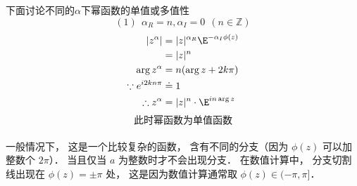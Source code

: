 下面讨论不同的$\alpha$下幂函数的单值或多值性\\

\[
(1)~~\alpha_R=n,\alpha_I=0~~(n\in\mathbb Z)
\]
\begin{align}
|z^\alpha|&=|z|^{\alpha_R}\E^{-\alpha_I\phi(z)}\notag\\
&=|z|^{n}\notag\\
\arg z^\alpha&=n(\arg z+2k\pi)\notag\\
\because e^{i2kn\pi}&\doteq1\notag\\
\therefore z^\alpha&=|z|^{n}\cdot \E^{in\arg z}
\end{align}
\[\text{此时幂函数为单值函数}\]
 \\一般情况下， 这是一个比较复杂的函数， 含有不同的分支（因为 $\phi(z)$ 可以加整数个 $2\pi$）．%
当且仅当 $a$ 为整数时才不会出现分支． 在数值计算中， 分支切割线出现在 $\phi(z) = \pm\pi$ 处， 这是因为数值计算通常取 $\phi(z)\in(-\pi, \pi]$．